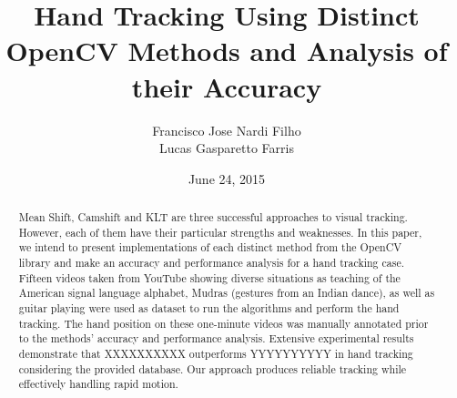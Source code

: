 \documentclass[a4paper]{article}
\title{Hand Tracking Using Distinct OpenCV Methods and Analysis of their Accuracy}
\author{Francisco Jose Nardi Filho\\ Lucas Gasparetto Farris}
\date{June 24, 2015}
\begin{document}
\maketitle

\begin{abstract}
\noindent
Mean Shift, Camshift and KLT are three successful approaches to visual tracking. However, each of them have their particular strengths and weaknesses. In this paper, we intend to present implementations of each distinct method from the OpenCV library and make an accuracy and  performance analysis for a hand tracking case. Fifteen videos taken from YouTube showing diverse situations as teaching of the American signal language alphabet, Mudras (gestures from an Indian dance), as well as guitar playing  were used as dataset to run the algorithms and perform the hand tracking. The hand position on these one-minute videos was manually annotated prior to the methods' accuracy and performance analysis. Extensive experimental results demonstrate that XXXXXXXXXX outperforms YYYYYYYYYY in hand tracking considering the provided database. Our approach produces reliable tracking while effectively handling rapid motion.
\end{abstract}
\end{document}
